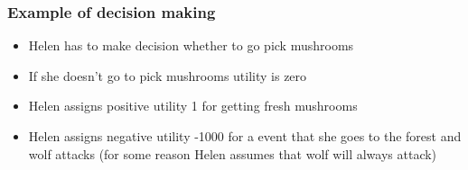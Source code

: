 \documentclass[10pt]{beamer}
\begin{document}
\begin{frame}

\frametitle{Example of decision making}

  \begin{itemize}
  \item<+-> Helen has to make decision whether to go pick mushrooms
  \item<+-> If she doesn't go to pick mushrooms utility is zero
  \item<+-> Helen assigns positive utility 1 for getting fresh mushrooms
  \item<+-> Helen assigns negative utility -1000 for a event that she goes to the forest and wolf attacks (for some reason Helen assumes that wolf will always attack)\\
    \vspace{\baselineskip}
    ~\\
    \vspace{\baselineskip}
  \end{itemize}

\end{frame}
\end{document}

